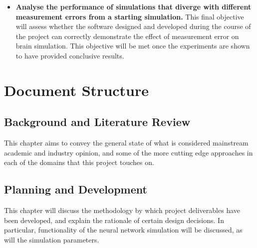 \begin{itemize}
{              modified during the simulation to emulate the measurement error of
              uploading the human brain.} Many of the parameters required in the
              creation of a simulation, such as the number of layers or the
              positions and links between neurons could be modified during a
              simulation using the tooling this project aims to develop. This
              objective will be complete when I have identified these
              parameters, and justified why they have been chosen over others.
    \item \textbf{Analyse the performance of simulations that diverge with
              different measurement errors from a starting simulation.} This
              final objective will assess whether the software designed and
              developed during the course of the project can correctly
              demonstrate the effect of measurement error on brain simulation.
              This objective will be met once the experiments are shown to have
              provided conclusive results.
\end{itemize}

% 

\section{Document Structure}

\subsection*{Background and Literature Review}
This chapter aims to convey the general state of what is considered mainstream
academic and industry opinion, and some of the more cutting edge approaches in
each of the domains that this project touches on.

\subsection*{Planning and Development}
This chapter will discuss the methodology by which project deliverables have
been developed, and explain the rationale of certain design decisions. In
particular, functionality of the neural network simulation will be
discussed, as will the simulation parameters.

